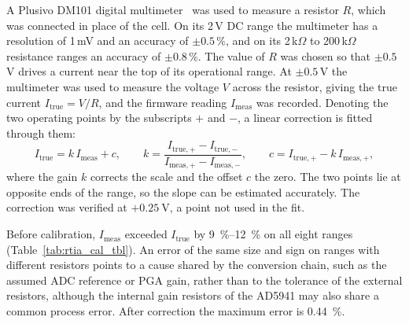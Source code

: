 A Plusivo DM101 digital multimeter~\cite{plusivo_dm101} was used to measure a resistor $R$, which
was connected in place of the cell. On its 2\,V DC range the multimeter has a resolution of 1\,mV
and an accuracy of $\pm0.5\,\%$, and on its 2\,k$\Omega$ to
200\,k$\Omega$ resistance ranges an accuracy of $\pm0.8\,\%$. The value of $R$ was
chosen so that $\pm0.5$\,V drives a current near the top of its operational range. At $\pm0.5$\,V
the multimeter was used to measure the voltage $V$ across the resistor, giving the true current
$I_\text{true} = V/R$, and the firmware reading $I_\text{meas}$ was recorded. Denoting the two operating points by the subscripts $+$ and $-$, a linear correction is fitted through them:
\begin{equation}
  I_\text{true} = k\,I_\text{meas} + c,
  \qquad
  k = \frac{I_{\text{true},+} - I_{\text{true},-}}{I_{\text{meas},+} - I_{\text{meas},-}},
  \qquad
  c = I_{\text{true},+} - k\,I_{\text{meas},+},
  \label{eq:rtia_cal}
\end{equation}
where the gain $k$ corrects the scale and the offset $c$ the zero. The two
points lie at opposite ends of the range, so the slope can be estimated
accurately. The correction was verified at $+\SI{0.25}{\volt}$, a point not
used in the fit.

Before calibration, $I_\text{meas}$ exceeded $I_\text{true}$ by \SIrange{9}{12}{\percent} on all
eight ranges (Table~\ref{tab:rtia_cal_tbl}). An error of the same size and sign on ranges with
different resistors points to a cause shared by the conversion chain, such as
the assumed ADC reference or PGA gain, rather than to the tolerance of the external resistors, although the internal gain resistors of the AD5941 may also share a common process error. After
correction the maximum error is \SI{0.44}{\percent}.

